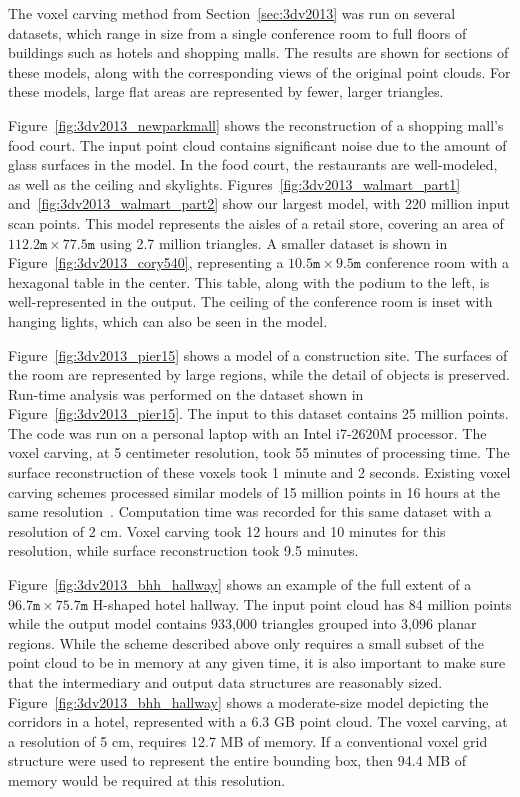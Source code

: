 \documentclass[12pt,onecolumn,oneside]{book}
\begin{document}
The voxel carving method from Section~\ref{sec:3dv2013} was run on several datasets, which range in size from a single conference room to full floors of buildings such as hotels and shopping malls.  The results are shown for sections of these models, along with the corresponding views of the original point clouds.  For these models, large flat areas are represented by fewer, larger triangles.

Figure~\ref{fig:3dv2013_newparkmall} shows the reconstruction of a shopping mall's food court.  The input point cloud contains significant noise due to the amount of glass surfaces in the model.  In the food court, the restaurants are well-modeled, as well as the ceiling and skylights.  Figures~\ref{fig:3dv2013_walmart_part1} and~\ref{fig:3dv2013_walmart_part2} show our largest model, with 220 million input scan points.  This model represents the aisles of a retail store, covering an area of $112.2\texttt{m} \times 77.5\texttt{m}$ using 2.7 million triangles.  A smaller dataset is shown in Figure~\ref{fig:3dv2013_cory540}, representing a $10.5\texttt{m} \times 9.5\texttt{m}$ conference room with a hexagonal table in the center.  This table, along with the podium to the left, is well-represented in the output.  The ceiling of the conference room is inset with hanging lights, which can also be seen in the model.  

Figure~\ref{fig:3dv2013_pier15} shows a model of a construction site.  The surfaces of the room are represented by large regions, while the detail of objects is preserved.  Run-time analysis was performed on the dataset shown in Figure~\ref{fig:3dv2013_pier15}.  The input to this dataset contains 25 million points.  The code was run on a personal laptop with an Intel i7-2620M processor.  The voxel carving, at 5 centimeter resolution, took 55 minutes of processing time.  The surface reconstruction of these voxels took 1 minute and 2 seconds.  Existing voxel carving schemes processed similar models of 15 million points in 16 hours at the same resolution~\cite{Carving}.  Computation time was recorded for this same dataset with a resolution of 2 cm.  Voxel carving took 12 hours and 10 minutes for this resolution, while surface reconstruction took 9.5 minutes.

Figure~\ref{fig:3dv2013_bhh_hallway} shows an example of the full extent of a $96.7\texttt{m} \times 75.7\texttt{m}$ H-shaped hotel hallway.  The input point cloud has 84 million points while the output model contains 933,000 triangles grouped into 3,096 planar regions.  While the scheme described above only requires a small subset of the point cloud to be in memory at any given time, it is also important to make sure that the intermediary and output data structures are reasonably sized.  Figure~\ref{fig:3dv2013_bhh_hallway} shows a moderate-size model depicting the corridors in a hotel, represented with a 6.3 GB point cloud.  The voxel carving, at a resolution of 5 cm, requires 12.7 MB of memory.  If a conventional voxel grid structure were used to represent the entire bounding box, then 94.4 MB of memory would be required at this resolution.
\end{document}
